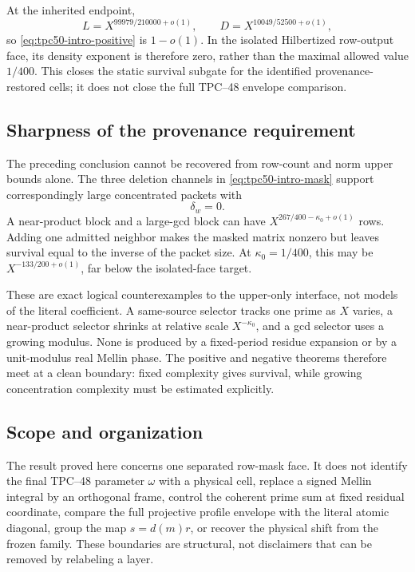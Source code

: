 At the inherited endpoint,
\begin{equation}
 L=X^{99979/210000+o(1)},
 \qquad
 D=X^{10049/52500+o(1)},
 \label{eq:tpc50-intro-endpoint-LD}
\end{equation}
so \eqref{eq:tpc50-intro-positive} is \(1-o(1)\).  In the isolated
Hilbertized row-output face, its density exponent is therefore zero,
rather than the maximal allowed value \(1/400\).  This closes the
static survival subgate for the identified provenance-restored cells;
it does not close the full TPC--48 envelope comparison.

\subsection{Sharpness of the provenance requirement}

The preceding conclusion cannot be recovered from row-count and norm
upper bounds alone.  The three deletion channels in
\eqref{eq:tpc50-intro-mask} support correspondingly large concentrated
packets with
\begin{equation}
 \delta_w=0.
 \label{eq:tpc50-intro-zero}
\end{equation}
A near-product block and a large-gcd block can have
\(X^{267/400-\kappa_0+o(1)}\) rows.  Adding one admitted neighbor makes
the masked matrix nonzero but leaves survival equal to the inverse of
the packet size.  At \(\kappa_0=1/400\), this may be
\(X^{-133/200+o(1)}\), far below the isolated-face target.

These are exact logical counterexamples to the upper-only interface,
not models of the literal coefficient.  A same-source selector tracks
one prime as \(X\) varies, a near-product selector shrinks at relative
scale \(X^{-\kappa_0}\), and a gcd selector uses a growing modulus.
None is produced by a fixed-period residue expansion or by a
unit-modulus real Mellin phase.  The positive and negative theorems
therefore meet at a clean boundary: fixed complexity gives survival,
while growing concentration complexity must be estimated explicitly.

\subsection{Scope and organization}

The result proved here concerns one separated row-mask face.  It does
not identify the final TPC--48 parameter \(\omega\) with a physical
cell, replace a signed Mellin integral by an orthogonal frame, control
the coherent prime sum at fixed residual coordinate, compare the full
projective profile envelope with the literal atomic diagonal, group
the map \(s=d(m)r\), or recover the physical shift from the frozen
family.  These boundaries are structural, not disclaimers that can be
removed by relabeling a layer.

